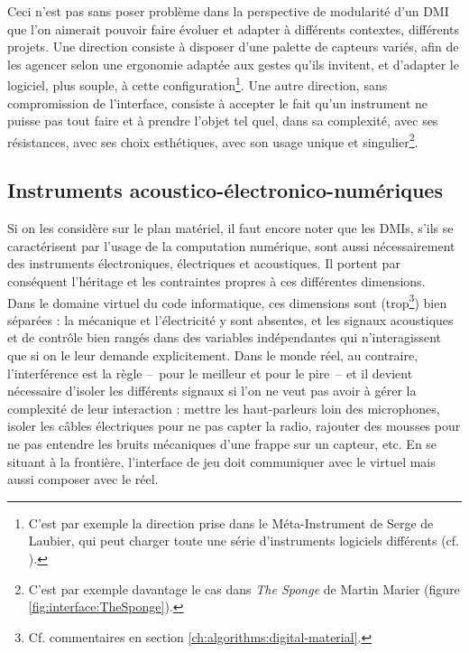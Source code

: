 \indent Ceci n'est pas sans poser problème dans la perspective de modularité d'un \gls{DMI} que l'on aimerait pouvoir faire évoluer et adapter à différents contextes, différents projets. Une direction consiste à disposer d'une palette de capteurs variés, afin de les agencer selon une ergonomie adaptée aux gestes qu'ils invitent, et d'adapter le logiciel, plus souple, à cette configuration\footnote{C'est par exemple la direction prise dans le Méta-Instrument de Serge de Laubier, qui peut charger toute une série d'instruments logiciels différents (cf. \cite{couprie_meta-instrument:_2018}).}. Une autre direction, sans compromission de l'interface, consiste à accepter le fait qu'un instrument ne puisse pas tout faire et à prendre l'objet tel quel, dans sa complexité, avec ses résistances, avec ses choix esthétiques, avec son usage unique et singulier\footnote{C'est par exemple davantage le cas dans \textit{The Sponge} de Martin Marier (figure \ref{fig:interface:TheSponge}).}. 

\subsection{Instruments acoustico-électronico-numériques}

\noindent Si on les considère sur le plan matériel, il faut encore noter que les \glspl{DMI}, s'ils se caractérisent par l'usage de la computation numérique, sont aussi nécessairement des instruments électroniques, électriques et acoustiques. Il portent par conséquent l'héritage et les contraintes propres à ces différentes dimensions.\\
\indent Dans le domaine virtuel du code informatique, ces dimensions sont (trop\footnote{Cf. commentaires en section \ref{ch:algorithms:digital-material}.}) bien séparées : la mécanique et l'électricité y sont absentes, et les signaux acoustiques et de contrôle bien rangés dans des variables indépendantes qui n'interagissent que si on le leur demande explicitement. Dans le monde réel, au contraire, l'interférence est la règle --~pour le meilleur et pour le pire~-- et il devient nécessaire d'isoler les différents signaux si l'on ne veut pas avoir à gérer la complexité de leur interaction : mettre les haut-parleurs loin des microphones, isoler les câbles électriques pour ne pas capter la radio, rajouter des mousses pour ne pas entendre les bruits mécaniques d'une frappe sur un capteur, etc. En se situant à la frontière, l'interface de jeu doit communiquer avec le virtuel mais aussi composer avec le réel.

